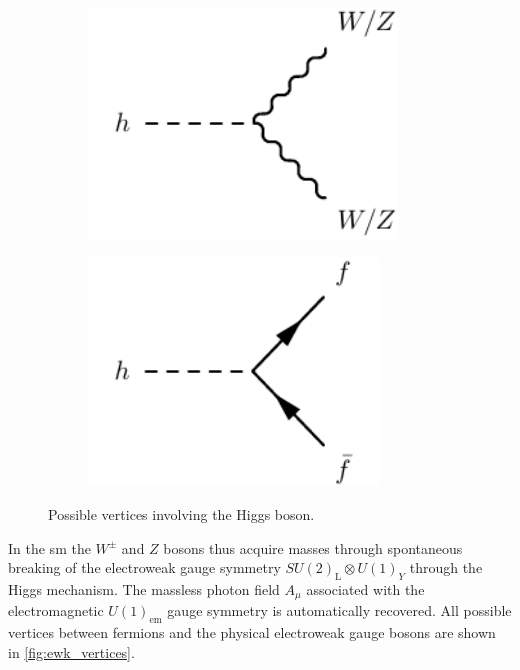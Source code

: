 \begin{figure}
\begin{subfigure}[b]{0.33\linewidth}
	\end{subfigure}
	\par\medskip
	\begin{subfigure}[b]{0.33\linewidth}
		\centering\includegraphics[width=0.9\textwidth]{h_boson_gauge_vertex}
	\end{subfigure}%
	\begin{subfigure}[b]{0.33\linewidth}
		\centering\includegraphics[width=0.85\textwidth]{h_boson_fermion_vertex}
	\end{subfigure}	
	\caption{Possible vertices involving the Higgs boson.}
	\label{fig:higgs_vertices}
\end{figure}

In the \gls{sm} the $W^\pm$ and $Z$ bosons thus acquire masses through spontaneous breaking of the electroweak gauge symmetry $SU(2)_\mathrm{L}\otimes U(1)_Y$ through the Higgs mechanism. The massless photon field $A_\mu$ associated with the electromagnetic $U(1)_\mathrm{em}$ gauge symmetry is automatically recovered. All possible vertices between fermions and the physical electroweak gauge bosons are shown in \cref{fig:ewk_vertices}. 

